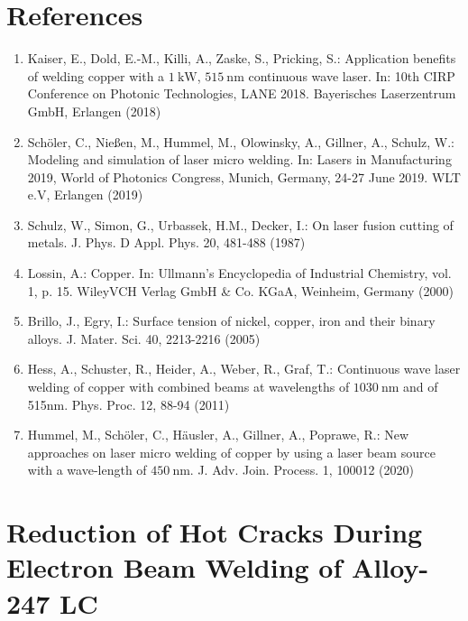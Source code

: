 \documentclass[10pt]{article}
\begin{document}
\section*{References}
\begin{enumerate}
  \item Kaiser, E., Dold, E.-M., Killi, A., Zaske, S., Pricking, S.: Application benefits of welding copper with a $1 \mathrm{~kW}$, $515 \mathrm{~nm}$ continuous wave laser. In: 10th CIRP Conference on Photonic Technologies, LANE 2018. Bayerisches Laserzentrum GmbH, Erlangen (2018)

  \item Schöler, C., Nießen, M., Hummel, M., Olowinsky, A., Gillner, A., Schulz, W.: Modeling and simulation of laser micro welding. In: Lasers in Manufacturing 2019, World of Photonics Congress, Munich, Germany, 24-27 June 2019. WLT e.V, Erlangen (2019)

  \item Schulz, W., Simon, G., Urbassek, H.M., Decker, I.: On laser fusion cutting of metals. J. Phys. D Appl. Phys. 20, 481-488 (1987)

  \item Lossin, A.: Copper. In: Ullmann's Encyclopedia of Industrial Chemistry, vol. 1, p. 15. WileyVCH Verlag GmbH \& Co. KGaA, Weinheim, Germany (2000)

  \item Brillo, J., Egry, I.: Surface tension of nickel, copper, iron and their binary alloys. J. Mater. Sci. 40, 2213-2216 (2005)

  \item Hess, A., Schuster, R., Heider, A., Weber, R., Graf, T.: Continuous wave laser welding of copper with combined beams at wavelengths of $1030 \mathrm{~nm}$ and of 515nm. Phys. Proc. 12, 88-94 (2011)

  \item Hummel, M., Schöler, C., Häusler, A., Gillner, A., Poprawe, R.: New approaches on laser micro welding of copper by using a laser beam source with a wave-length of $450 \mathrm{~nm}$. J. Adv. Join. Process. 1, 100012 (2020)

\end{enumerate}

\section*{Reduction of Hot Cracks During Electron Beam Welding of Alloy-247 LC }
\end{document}
